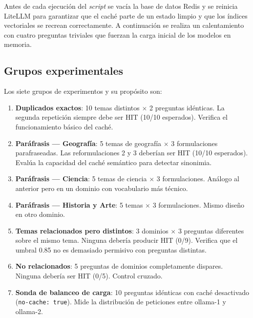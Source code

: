 Antes de cada ejecución del \textit{script} se vacía la base de datos Redis y se reinicia LiteLLM para garantizar que el caché parte de un estado limpio y que los índices vectoriales se recrean correctamente. A continuación se realiza un calentamiento con cuatro preguntas triviales que fuerzan la carga inicial de los modelos en memoria.

\subsection{Grupos experimentales}

Los siete grupos de experimentos y su propósito son:

\begin{enumerate}
    \item \textbf{Duplicados exactos}: 10 temas distintos $\times$ 2 preguntas idénticas. La segunda repetición siempre debe ser HIT (10/10 esperados). Verifica el funcionamiento básico del caché.
    
    \item \textbf{Paráfrasis --- Geografía}: 5 temas de geografía $\times$ 3 formulaciones parafraseadas. Las reformulaciones 2 y 3 deberían ser HIT (10/10 esperados). Evalúa la capacidad del caché semántico para detectar sinonimia.
    
    \item \textbf{Paráfrasis --- Ciencia}: 5 temas de ciencia $\times$ 3 formulaciones. Análogo al anterior pero en un dominio con vocabulario más técnico.
    
    \item \textbf{Paráfrasis --- Historia y Arte}: 5 temas $\times$ 3 formulaciones. Mismo diseño en otro dominio.
    
    \item \textbf{Temas relacionados pero distintos}: 3 dominios $\times$ 3 preguntas diferentes sobre el mismo tema. Ninguna debería producir HIT (0/9). Verifica que el umbral 0.85 no es demasiado permisivo con preguntas distintas.
    
    \item \textbf{No relacionados}: 5 preguntas de dominios completamente dispares. Ninguna debería ser HIT (0/5). Control cruzado.
    
    \item \textbf{Sonda de balanceo de carga}: 10 preguntas idénticas con caché desactivado (\texttt{no-cache: true}). Mide la distribución de peticiones entre ollama-1 y ollama-2.
\end{enumerate}

